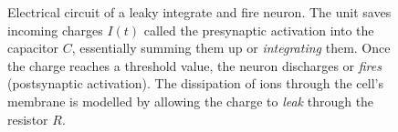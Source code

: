 \begin{figure}
    \centering
{}
\caption[Electrical circuit of a leaky integrate and fire neuron]{Electrical circuit of a leaky integrate and fire neuron. The unit saves incoming charges $I(t)$ called the presynaptic activation into the capacitor $C$, essentially summing them up or \emph{integrating} them. Once the charge reaches a threshold value, the neuron discharges or \emph{fires} (postsynaptic activation). The dissipation of ions through the cell's membrane is modelled by allowing the charge to \emph{leak} through the resistor $R$.}\label{fig:LIF}
\end{figure}\noindent
